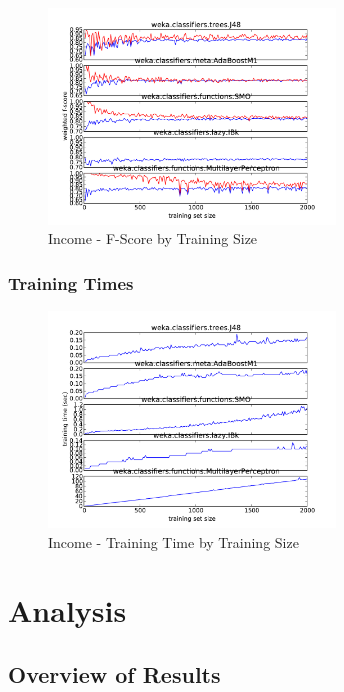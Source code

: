 \documentclass{sig-alternate}
\begin{document}
\begin{figure}[!htbp]
    \centering
    \includegraphics[width=3in]{data/adult/learning-curve-10to2000/stacked-fscore.pdf}
    \caption{Income - F-Score by Training Size \label{ad-error}}
\end{figure} 

\subsubsection{Training Times}

\begin{figure}[!htbp]
    \centering
    \includegraphics[width=3in]{data/adult/learning-curve-10to2000/runtime.pdf}
    \caption{Income - Training Time by Training Size \label{ad-runtime}}
\end{figure} 

\section{Analysis}

\subsection{Overview of Results}
\end{document}
